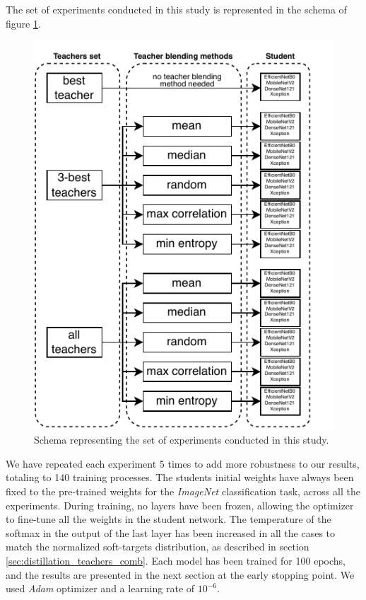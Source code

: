 The set of experiments conducted in this study is represented in the schema of figure \ref{fig:schema}.

\begin{figure}[h!]
\centering
\includegraphics[width=0.9\linewidth]{distillation/images/schema}
\caption{Schema representing the set of experiments conducted in this study.}
\label{fig:schema}
\end{figure}


We have repeated each experiment 5 times to add more robustness to our results, totaling to 140 training processes. The students initial weights have always been fixed to the pre-trained weights for the \textit{ImageNet} classification task, across all the experiments. During training, no layers have been frozen, allowing the optimizer to fine-tune all the weights in the student network. The temperature of the softmax in the output of the last layer has been increased in all the cases to match the normalized soft-targets distribution, as described in section \ref{sec:distillation_teachers_comb}.  Each model has been trained for 100 epochs, and the results are presented in the next section at the early stopping point. We used \textit{Adam} optimizer \autocite{kingma14} and a learning rate of $10^{-6}$.

